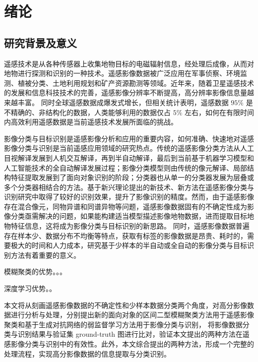 
\chapter{绪论}
\label{cha:chap01}

\section{研究背景及意义}
\label{sec:first}

遥感技术是从各种传感器上收集地物目标的电磁辐射信息，经处理后成像，从而对地物进行探测和识别的一种技术。遥感影像数据被广泛应用在军事侦察、环境监测、植被分类、土地利用规划和矿产资源勘测等领域\cite{lishihua2005}。近年来，随着卫星遥感技术的发展和信息科技技术的完善，遥感影像分辨率不断提高，高分辨率影像信息量越来越丰富。 同时全球遥感数据成爆发式增长，但相关统计表明，遥感数据 $95\%$ 是不精确的、非结构化的数据，人类能够利用的数据仅占 $5\%$ 左右\cite{zhangjun2010}，如何在有限时间内高效利用遥感数据是当前遥感技术发展所面临的挑战。

影像分类与目标识别是遥感影像分析和应用的重要内容，如何准确、快速地对遥感影像分类与识别是当前遥感应用领域的研究热点。传统的遥感影像分类方法从人工目视解译发展到人机交互解译，再到半自动解译，最后到当前基于机器学习模型和人工智能技术的全自动解译发展过程；影像分类模型则由传统的像元解译、局部结构特征提取发展到了面向对象识别的阶段；分类器也从单一的分类器发展为层叠或多个分类器相结合的方法\cite{lideren2012}。基于新兴理论提出的新技术、新方法在遥感影像分类与识别研究中取得了较好的识别效果，提升了影像识别的精度。然而，由于遥感影像存在混合像元，同物异谱和同谱异物等问题\cite{wulun2006}，遥感影像数据固有的不确定性成为影像分类亟需解决的问题，如果能构建适当模型描述影像地物数据，进而提取目标地物特征信息，这将成为影像分类与目标识别的新思路\cite{he2005comparison}。 同时，遥感影像数据普遍存在样本少、数据分布不均衡等特点，获取有标签的影像数据是昂贵、耗时的，需要极大的时间和人力成本，研究基于少样本的半自动或全自动的影像分类与目标识别方法有着重要的意义。

模糊聚类的优势。。。

深度学习优势。。

本文将从刻画遥感影像数据的不确定性和少样本数据分类两个角度，对高分影像数据进行分析与处理，分别提出新的面向对象的区间二型模糊聚类方法用于遥感影像聚类和基于生成对抗网络的弱监督学习方法用于影像分类与识别， 将影像数据分类与识别结果与验证集 ground-truth 图进行比对，验证本文提出的两种方法在遥感影像分类与识别中的有效性。此外，本文综合提出的两种方法，形成一个完整的处理流程，实现高分影像数据的信息提取与分类识别。



